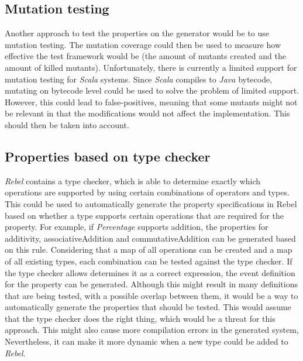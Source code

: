 \subsection*{Mutation testing}
Another approach to test the properties on the generator would be to use mutation testing. The mutation coverage could then be used to measure how effective the test framework would be (the amount of mutants created and the amount of killed mutants). Unfortunately, there is currently a limited support for mutation testing for \textit{Scala} systems. Since \textit{Scala} compiles to \textit{Java} bytecode, mutating on bytecode level could be used to solve the problem of limited support. However, this could lead to false-positives, meaning that some mutants might not be relevant in that the modifications would not affect the implementation. This should then be taken into account.

\subsection*{Properties based on type checker}
\textit{Rebel} contains a type checker, which is able to determine exactly which operations are supported by using certain combinations of operators and types. This could be used to automatically generate the property specifications in Rebel based on whether a type supports certain operations that are required for the property. For example, if \textit{Percentage} supports addition, the properties for additivity, associativeAddition and commutativeAddition can be generated based on this rule. Considering that a map of all operations can be created and a map of all existing types, each combination can be tested against the type checker. If the type checker allows determines it as a correct expression, the event definition for the property can be generated. Although this might result in many definitions that are being tested, with a possible overlap between them, it would be a way to automatically generate the properties that should be tested. This would assume that the type checker does the right thing, which would be a threat for this approach. This might also cause more compilation errors in the generated system, Nevertheless, it can make it more dynamic when a new type could be added to \textit{Rebel}.
